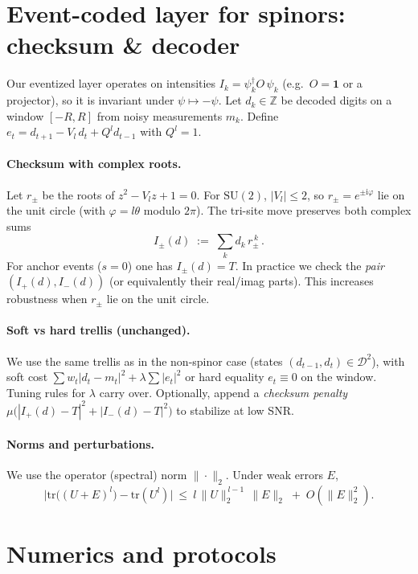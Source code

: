 \documentclass[aps,prb,twocolumn,superscriptaddress,nofootinbib,10pt]{revtex4-2}
\theoremstyle{definition}
\theoremstyle{remark}
\newcommand{\Z}{\mathbb{Z}}
\newcommand{\tr}{\mathrm{tr}}
\newcommand{\SU}{\mathrm{SU}}
\newcommand{\ii}{\mathrm{i}}
\begin{document}
\section{Event-coded layer for spinors: checksum \& decoder}
Our eventized layer operates on intensities $I_k=\psi_k^\dagger O\,\psi_k$ (e.g.\ $O=\mathbf{1}$ or a projector), so it is
invariant under $\psi\mapsto -\psi$. Let $d_k\in\Z$ be decoded digits on a window $[-R,R]$ from noisy measurements $m_k$.
Define $e_t=d_{t+1}-V_l\,d_t+Q^l d_{t-1}$ with $Q^l=1$.

\paragraph*{Checksum with complex roots.}
Let $r_{\pm}$ be the roots of $z^2-V_l z+1=0$. For $\SU(2)$, $|V_l|\le 2$, so $r_{\pm}=e^{\pm \ii \varphi}$ lie on the unit circle
(with $\varphi=l\theta$ modulo $2\pi$). The tri-site move preserves both complex sums
\begin{equation}\label{eq:two-checks}
I_{\pm}(d)\;:=\;\sum_k d_k\,r_{\pm}^{\,k}\,.
\end{equation}
For anchor events ($s=0$) one has $I_{\pm}(d)=T$. In practice we check the \emph{pair} $(I_+(d),I_-(d))$ (or equivalently
their real/imag parts). This increases robustness when $r_\pm$ lie on the unit circle.

\paragraph*{Soft vs hard trellis (unchanged).}
We use the same trellis as in the non-spinor case (states $(d_{t-1},d_t)\in\mathcal{D}^2$), with soft cost
$\sum w_t|d_t-m_t|^2+\lambda\sum |e_t|^2$ or hard equality $e_t\equiv 0$ on the window. Tuning rules for $\lambda$ carry over.
Optionally, append a \emph{checksum penalty} $\mu\big(|I_+(d)-T|^2+|I_-(d)-T|^2\big)$ to stabilize at low SNR.

\paragraph*{Norms and perturbations.}
We use the operator (spectral) norm $\|\cdot\|_2$. Under weak errors $E$,
\begin{equation}
\big|\tr\big((U{+}E)^l\big)-\tr(U^l)\big| \ \le\ l\,\|U\|_2^{\,l-1}\,\|E\|_2 \;+\; O(\|E\|_2^2).
\end{equation}

\section{Numerics and protocols}
\end{document}
